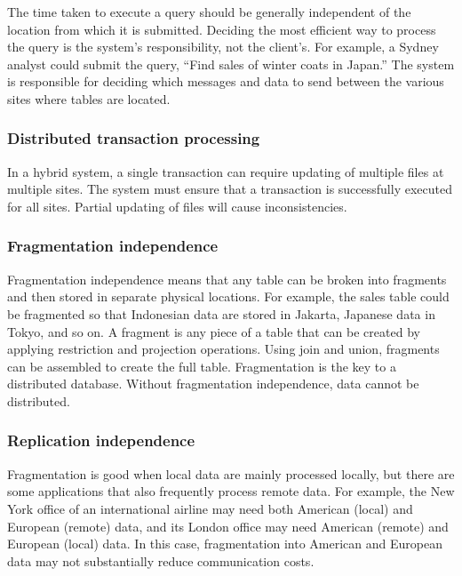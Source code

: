 \documentclass[
]{article}
\begin{document}
The time taken to execute a query should be generally independent of the
location from which it is submitted. Deciding the most efficient way to
process the query is the system's responsibility, not the client's. For
example, a Sydney analyst could submit the query, ``Find sales of winter
coats in Japan.'' The system is responsible for deciding which messages
and data to send between the various sites where tables are located.

\hypertarget{distributed-transaction-processing}{%
\subsubsection*{Distributed transaction processing}\label{distributed-transaction-processing}}

In a hybrid system, a single transaction can require updating of
multiple files at multiple sites. The system must ensure that a
transaction is successfully executed for all sites. Partial updating of
files will cause inconsistencies.

\hypertarget{fragmentation-independence}{%
\subsubsection*{Fragmentation independence}\label{fragmentation-independence}}

Fragmentation independence means that any table can be broken into
fragments and then stored in separate physical locations. For example,
the sales table could be fragmented so that Indonesian data are stored
in Jakarta, Japanese data in Tokyo, and so on. A fragment is any piece
of a table that can be created by applying restriction and projection
operations. Using join and union, fragments can be assembled to create
the full table. Fragmentation is the key to a distributed database.
Without fragmentation independence, data cannot be distributed.

\hypertarget{replication-independence}{%
\subsubsection*{Replication independence}\label{replication-independence}}

Fragmentation is good when local data are mainly processed locally, but
there are some applications that also frequently process remote data.
For example, the New York office of an international airline may need
both American (local) and European (remote) data, and its London office
may need American (remote) and European (local) data. In this case,
fragmentation into American and European data may not substantially
reduce communication costs.
\end{document}
